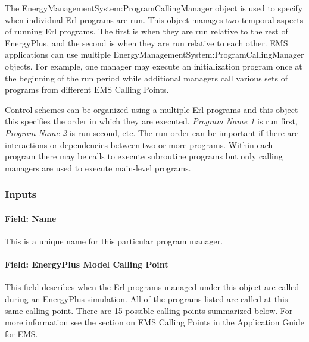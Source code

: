The EnergyManagementSystem:ProgramCallingManager object is used to specify when individual Erl programs are run. This object manages two temporal aspects of running Erl programs. The first is when they are run relative to the rest of EnergyPlus, and the second is when they are run relative to each other. EMS applications can use multiple EnergyManagementSystem:ProgramCallingManager objects. For example, one manager may execute an initialization program once at the beginning of the run period while additional managers call various sets of programs from different EMS Calling Points.

Control schemes can be organized using a multiple Erl programs and this object this specifies the order in which they are executed. \emph{Program Name 1} is run first, \emph{Program Name 2} is run second, etc. The run order can be important if there are interactions or dependencies between two or more programs. Within each program there may be calls to execute subroutine programs but only calling managers are used to execute main-level programs.

\subsubsection{Inputs}\label{inputs-2-012}

\paragraph{Field: Name}\label{field-name-2-011}

This is a unique name for this particular program manager.

\paragraph{Field: EnergyPlus Model Calling Point}\label{field-energyplus-model-calling-point}

This field describes when the Erl programs managed under this object are called during an EnergyPlus simulation. All of the programs listed are called at this same calling point. There are 15 possible calling points summarized below. For more information see the section on EMS Calling Points in the Application Guide for EMS.

